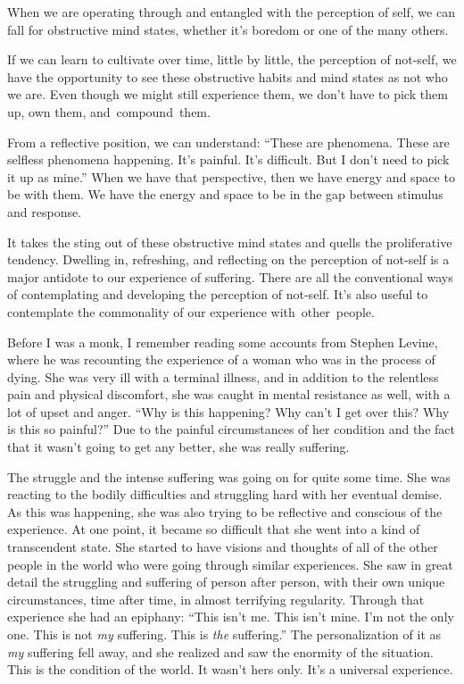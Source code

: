 When we are operating through and entangled with the perception of self, we can fall for obstructive mind states, whether it's boredom or one of the many others.

If we can learn to cultivate over time, little by little, the perception of not-self, we have the opportunity to see these obstructive habits and mind states as not who we are. Even though we might still experience them, we don't have to pick them up, own them, \mbox{and compound them.}

From a reflective position, we can understand: ``These are phenomena. These are selfless phenomena happening. It's painful. It's difficult. But I don't need to pick it up as mine.'' When we have that perspective, then we have energy and space to be with them. We have the energy and space to be in the gap between stimulus and response.

It takes the sting out of these obstructive mind states and quells the proliferative tendency. Dwelling in, refreshing, and reflecting on the perception of not-self
is a major antidote to our experience of suffering. There are all the conventional ways of contemplating and developing the perception of not-self. It's also useful to contemplate the commonality of our experience \mbox{with other people.}

Before I was a monk, I remember reading some accounts from Stephen Levine, where he was recounting the experience of a woman who was in the process of dying. She was very ill with a terminal illness, and in addition to the relentless pain and physical discomfort, she was caught in mental resistance as well, with a lot of upset and anger. ``Why is this happening? Why can't I get over this? Why is this so painful?'' Due to the painful circumstances of her condition and the fact that it wasn't going to get any better, she was really suffering.

The struggle and the intense suffering was going on for quite some time. She was reacting to the bodily difficulties and struggling hard with her eventual demise. As this was happening, she was also trying to be reflective and conscious of the experience. At one point, it became so difficult that she went into a kind of transcendent state. She started to have visions and thoughts of all of the other people in the world who were going through similar experiences. She saw in great detail the struggling and suffering of person after person, with their own unique circumstances, time after time, in almost terrifying regularity. Through that experience she had an epiphany: ``This isn't me. This isn't mine. I'm not the only one. This is not \emph{my} suffering. This is \emph{the} suffering.'' The personalization of it as \emph{my} suffering fell away, and she realized and saw the enormity of the situation. This is the condition of the world. It wasn't hers only. It's a universal experience.

